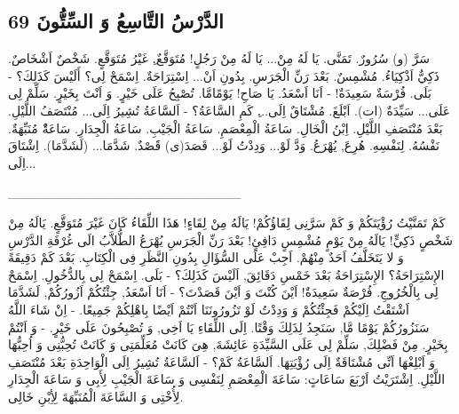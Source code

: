 \documentclass[a5paper]{article}
\begin{document}
\subsection{الدَّرْسُ التَّاسِعُ وَ السِّتُّونَ 69}
سَرَّ (و) سُرُورٌ. تَمَنَّى. يَا لَهُ مِنْ... يَا لَهُ مِنْ رَجُلٍ! مُتَوَقَّعٌ.ِ غَيْرُ مُتَوَقَّعٍ. شَخْصٌ اَشْخَاصٌ. ذَكِيٌّ اَذْكِيَاءُ. مُشْمِسٌ. بَعْدَ رَنِّ الْجَرَسِ. بِدُونِ اَنْ... اِسْتِرَاحَةٌ. اِسْمَحْ لِى؟ أَلَيْسَ كَذَلِكَ؟ - بَلَى. فُرْسَةٌ سَعِيدَةٌ! - اَنَا اَسْعَدُ. يَا صَاحِ! يَوْمًامَّا. تُصْبِحُ عَلَى خَيْرٍ. وَ اَنْتَ بِخَيْرٍ. سَلِّمْ لِى عَلَى... سَيِّدَةٌ (ات). اَبْلَغَ. مُشْتَاقٌ اِلَى...ِ كَمِ السَّاعَةُ؟ - اَلسَّاعَةُ تُشِيرُ اِلَى... مُنْتَصَفُ اللَّيْلِ. بَعْدَ مُنْتَصَفِ اللَّيْلِ. اِبْنُ الْخَالِ. سَاعَةُ الْمِعْصَمِ. سَاعَةُ الْجَيْبِ. سَاعَةُ الْجِدَارِ. سَاعَةٌْ مُنَبِّهَةٌ. نَفْسُهُ. لِنَفْسِهِ. هُرِعَ, يُهْرَعُ. وَدَّ لَوْ... وَدِدْتُ لَوْ... قَصَدَ(ى) قََصْدٌ. شَدَّمَا... (لَشَدَّمَا). اِشْتَاقَ اِلَى...ِ

\_\_\_\_\_\_\_\_\_\_\_\_\_\_\_\_\_\_\_\_\_\_\_\_\_

كَمْ تَمَنَّيْتُ رُؤْيَتَكُمْ وَ كَمْ سَرَّنِى لِقَاؤُكُمْ! يَالَهُ مِنْ لِقَاءٍ! هَذَا اللِّقَاءُ كَانَ غَيْرَ مُتَوَقَّعٍ. يَالَهُ مِنْ شَخْصٍ ذَكِيٍّ! يَالَهُ مِنْ يَوْمٍ مُشْمِسٍ دَافِئٍ! بَعْدَ رَنِّ الْجَرَسِ يُهْرَعُ الطُّلاَّبُ الَى غُرْفَةِ الدَّرْسِ وَ لا يَتَخَلَّفُ اَحَدٌ مِنْهُمْ. اَجِبْ عَلَى السُّؤَالِ بِدُونِ النَّظَرِ فِى الْكِتَابِ. بَعْدَ كَمْ دَقِيقَةً الإِسْتِرَاحَةُ؟ الإِسْتِرَاحَةُ بَعْدَ خَمْسِ دَقَائِقَ, اَلَيْسَ كَذَلِكَ؟ - بَلَى. اِسْمَحْ لِى بِالدُّخُولِ. اِسْمَحْ لِى بِالْخُرُوجِ. فُرْصَةٌ سَعِيدَةٌ! اَيْنَ كُنْتَ وَ اَيْنَ قَصَدْتَ؟ - اَنَا اَسْعَدُ, جِئْتُكُمْ اَزُورُكُمْ, لَشَدَّمَا اَشْتَقْتُ اِلَيْكُمْ فَجِئْتُكُمْ وَ وَدِدْتُ لَوْ تَزُورُونَنَا اَنْتُمْ اَيْضًا بِاهْلِكُمْ جَمِيعًا. - اِنْ شَاءَ اللَّهُ سَنَزُورُكُمْ يَوْمًا مَّا, سَنَجِدُ لِذَلِكَ وَقْتًا. اِلَى اللِّقَاءِ يَا اَخِى, وَ تُصْبِحُونَ عَلَى خَيْرٍ. - وَ اَنْتُمْ بِخَيْرٍ. مِنْ فَضْلِكَ, سَلِّمْ لِى عَلَى السَّيِّدَةِ عَائِشَةَ, هِىَ كَانَتْ مُعَلِّمَتِى وَ كَانَتْ تُحِبُّنِى وَ اُحِبُّهَا وَ اَبْلِغْهَا اَنِّى مُشْتَاقَةٌ اِلَى رُؤْيَتِهَا. اَلسَّاعَةُ كَمْ؟ - اَلسَّاعَةُ تُشِيرُ اِلَى الْوَاحِدَةِ بَعْدَ مُنْتَصَفِ اللَّيْلِ. اِشْتَرَيْتُ اَرْبَعَ سَاعَاتٍ: سَاعَةَ الْمِعْصَمِ لِنَفْسِى وَ سَاعَةَ الْجَيْبِ لِأَبِى وَ سَاعَةَ الْجِدَارِ لِأُخْتِى وَ السَّاعَةَ الْمُنَبِّهَةَ لِأِبْنِ خَالِى.ِ
\end{document}
